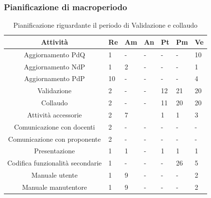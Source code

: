 \subsubsection{Pianificazione di macroperiodo}
\begin{table}[H]
	\centering
	\renewcommand{\arraystretch}{1.5}
	\begin{tabular}{|c|p{10mm}|p{10mm}|p{10mm}|p{10mm}|p{10mm}|p{10mm}|}
		\hline
		\rowcolor{lighter-grayer}
		Attività & Re & Am & An & Pt & Pm & Ve \\ \hline
		Aggiornamento PdQ                                                           & 1           &    -         &      -       &     -        &     -        & 10          \\ \hline
		Aggiornamento NdP                                                           & 1           & 2           &    -         &     -        &      -       & 1           \\ \hline
		Aggiornamento PdP                                                           & 10          &     -        &    -         &     -        &    -         & 4           \\ \hline
		Validazione                                                                 & 2           &   -          &       -      & 12          & 21          & 20          \\ \hline
		Collaudo                                                                    & 2           &     -        &     -        & 11          & 20          & 20          \\ \hline
		Attività accessorie & 2           & 7           &             & 1           & 1           & 3           \\ \hline
		Comunicazione con docenti                                                   & 2           &     -        &      -       &     -        &      -       &     -        \\ \hline
		Comunicazione con proponente                                                & 2           &    -         &       -      &   -          &     -        &    -         \\ \hline
		Presentazione                                                               & 1           & 1           &    -         & 1           & 1           & 1           \\ \hline
		Codifica funzionalità secondarie                                            & 1           &    -         &      -       &    -        & 26          & 5           \\ \hline
		Manuale utente                                                              & 1           & 9           &     -        &    -         &     -        & 2           \\ \hline
		Manuale manutentore                                                         & 1           & 9           &      -       &      -       &     -        & 2           \\ \hline
	\end{tabular}
	\caption{ Pianificazione riguardante il periodo di Validazione e collaudo\\}
\end{table}